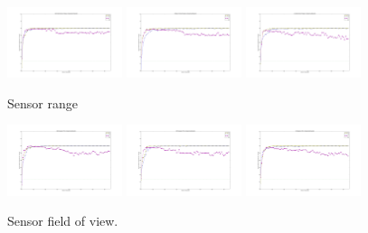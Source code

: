 \documentclass[letterpaper, 10 pt, conference]{ieeeconf}  %
\begin{document}
\begin{figure}
    \centering
    \includegraphics[width=0.3\textwidth]{SRUnlim.png}
    \includegraphics[width=0.3\textwidth]{SRMed.png}
    \includegraphics[width=0.3\textwidth]{SRL.png}
    \caption{Sensor range}
    \label{fig:sensor-range}
\end{figure}

\begin{figure}
    \centering
    \includegraphics[width=0.3\textwidth]{SF360.png}
    \includegraphics[width=0.3\textwidth]{SF270.png}
    \includegraphics[width=0.3\textwidth]{SF90.png}
    \caption{Sensor field of view.}
    \label{fig:sensor-fov}
\end{figure}
\end{document}
